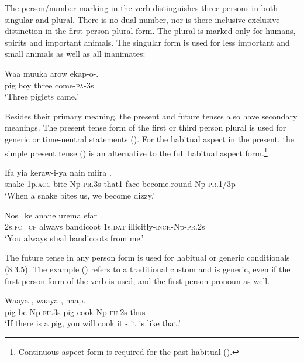 The person/number marking in the verb distinguishes three persons in both singular and plural. There is no dual number, nor is there inclusive-exclusive distinction in the first person plural form. The plural is marked only for humans, spirits and important animals. The singular form is used for less important and small animals as well as all inanimates:

\ea%
\label{ex:x236}
\gll Waa muuka arow ekap-o-. \\
pig boy three come-\textsc{pa}-3s \\
\glt`Three piglets came.'
\z

Besides their primary meaning, the present and future tenses also have secondary meanings. The present tense form of the first or third person plural is used for generic or time-neutral statements (). For the habitual aspect in the present, the simple present tense () is an alternative to the full habitual aspect form.\footnote{Continuous aspect form is required for the past habitual ().} 

\ea%
\label{ex:x1034}
\gll Ifa yia keraw-i-ya nain miira . \\
snake 1p.\textsc{acc} bite-Np-\textsc{pr}.3s that1 face become.round-Np-\textsc{pr}.1/3p\\
\glt `When a snake bites us, we become dizzy.'
\z

\ea%
\label{ex:x1035}
\gll Nos=ke anane urema efar . \\
2s.\textsc{fc}=\textsc{cf} always bandicoot 1s.\textsc{dat} illicitly-\textsc{inch}-Np-\textsc{pr}.2s\\
\glt`You always steal bandicoots from me.'
\z

The future tense in any person form is used for habitual or generic conditionals (8.3.5). The example () refers to a traditional custom and is generic, even if the first person form of the verb is used, and the first person pronoun as well.

\ea%
\label{ex:x1640}
\gll Waaya , waaya , naap. \\
pig be-Np-\textsc{fu}.3s pig cook-Np-\textsc{fu}.2s thus\\
\glt`If there is a pig, you will cook it - it is like that.'
\z

